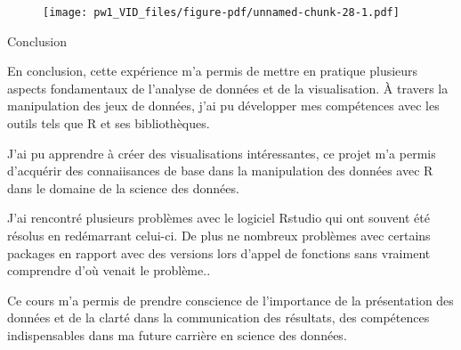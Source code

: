 \documentclass[
  letterpaper,
  DIV=11,
  numbers=noendperiod]{scrartcl}
\begin{document}
\begin{figure}[H]

{\centering \texttt{[image: pw1\_VID\_files/figure-pdf/unnamed-chunk-28-1.pdf]}

}

\end{figure}

Conclusion

En conclusion, cette expérience m'a permis de mettre en pratique
plusieurs aspects fondamentaux de l'analyse de données et de la
visualisation. À travers la manipulation des jeux de données, j'ai pu
développer mes compétences avec les outils tels que R et ses
bibliothèques.

J'ai pu apprendre à créer des visualisations intéressantes, ce projet
m'a permis d'acquérir des connaiisances de base dans la manipulation des
données avec R dans le domaine de la science des données.

J'ai rencontré plusieurs problèmes avec le logiciel Rstudio qui ont
souvent été résolus en redémarrant celui-ci. De plus ne nombreux
problèmes avec certains packages en rapport avec des versions lors
d'appel de fonctions sans vraiment comprendre d'où venait le problème..

Ce cours m'a permis de prendre conscience de l'importance de la
présentation des données et de la clarté dans la communication des
résultats, des compétences indispensables dans ma future carrière en
science des données.
\end{document}
